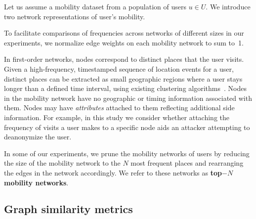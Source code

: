 Let us assume a mobility dataset from a population of users $ u \in U$.
We introduce two network representations of user's mobility.



\vspace{.4cm}
To facilitate comparisons of frequencies across networks of different sizes in our experiments, we normalize edge weights on each mobility network to sum \mbox{to 1}.

In first-order networks, nodes correspond to distinct places that the user visits.
Given a high-frequency, timestamped sequence of location events for a user, distinct places can be extracted as small geographic regions where a user stays longer than a defined time interval, using existing clustering algorithms~\citep{kang2005extracting}.
Nodes in the mobility network have no geographic or timing information associated with them.
Nodes may have \emph{attributes} attached to them reflecting additional side information.
For example, in this study we consider whether attaching the frequency of visits a user makes to a specific node aids an attacker attempting to deanonymize the user.

In some of our experiments, we prune the mobility networks of users by reducing the size of the mobility network to the $ N $ most frequent places and rearranging the edges in the network accordingly.
We refer to these networks as \textbf{top$-N $ mobility networks}.

\subsection{Graph similarity metrics\label{sec:graph-kernels}}

